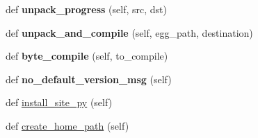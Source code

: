 \begin{DoxyCompactItemize}
def {\bfseries unpack\+\_\+progress} (self, src, dst)
\item 
\mbox{\label{classsetuptools_1_1command_1_1easy__install_1_1easy__install_aae5fc3f2c8f88abfa4cd229f05393fd0}} 
def {\bfseries unpack\+\_\+and\+\_\+compile} (self, egg\+\_\+path, destination)
\item 
\mbox{\label{classsetuptools_1_1command_1_1easy__install_1_1easy__install_ac60bc1c1e9e4c905fc13e10a873fc46f}} 
def {\bfseries byte\+\_\+compile} (self, to\+\_\+compile)
\item 
\mbox{\label{classsetuptools_1_1command_1_1easy__install_1_1easy__install_a3c9c55db91bbca5de6ee692c4a3db836}} 
def {\bfseries no\+\_\+default\+\_\+version\+\_\+msg} (self)
\item 
def \hyperlink{classsetuptools_1_1command_1_1easy__install_1_1easy__install_a2c06c83145c9aac6a5e30074dd2f9e20}{install\+\_\+site\+\_\+py} (self)
\item 
def \hyperlink{classsetuptools_1_1command_1_1easy__install_1_1easy__install_a978d8026468f5e011d38fd2129feb577}{create\+\_\+home\+\_\+path} (self)
\end{DoxyCompactItemize}
